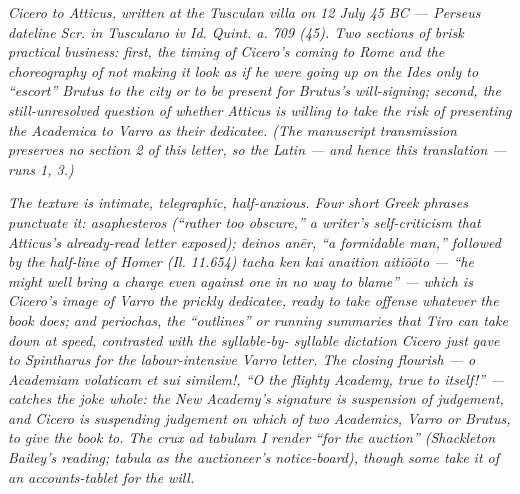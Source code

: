 
\textit{Cicero to Atticus, written at the Tusculan villa on 12 July
45 BC --- Perseus dateline \textit{Scr. in Tusculano iv Id. Quint.
a. 709 (45)}. Two sections of brisk practical business: first,
the timing of Cicero's coming to Rome and the choreography of
not making it look as if he were going up on the Ides only to
``escort'' Brutus to the city or to be present for Brutus's
will-signing; second, the still-unresolved question of whether
Atticus is willing to take the risk of presenting the
\textit{Academica} to Varro as their dedicatee. (The
manuscript transmission preserves no section 2 of this letter,
so the Latin --- and hence this translation --- runs
\textsc{1}, \textsc{3}.)}

\textit{The texture is intimate, telegraphic, half-anxious. Four
short Greek phrases punctuate it: \textit{asaphesteros}
(``rather too obscure,'' a writer's self-criticism that Atticus's
already-read letter exposed); \textit{deinos an\=er}, ``a
formidable man,'' followed by the half-line of Homer
(\textit{Il.} 11.654) \textit{tacha ken kai anaition aiti\=o\=oto}
--- ``he might well bring a charge even against one in no way to
blame'' --- which is Cicero's image of Varro the prickly
dedicatee, ready to take offense whatever the book does; and
\textit{periochas}, the ``outlines'' or running summaries that
Tiro can take down at speed, contrasted with the syllable-by-
syllable dictation Cicero just gave to Spintharus for the
labour-intensive Varro letter. The closing flourish ---
\textit{o Academiam volaticam et sui similem!}, ``O the flighty
Academy, true to itself!'' --- catches the joke whole: the New
Academy's signature is suspension of judgement, and Cicero is
suspending judgement on which of two Academics, Varro or Brutus,
to give the book to. The crux \textit{ad tabulam} I render
``for the auction'' (Shackleton Bailey's reading; \textit{tabula}
as the auctioneer's notice-board), though some take it of an
accounts-tablet for the will.}
